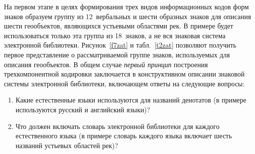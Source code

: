 \begin{multicols}{2}
   На первом этапе в целях формирования трех видов информационных кодов форм знаков 
образуем группу из 12~вербальных и шести образных знаков для описания шести 
геообъектов, явля\-ющих\-ся устьевыми областями рек. В примере будет использоваться только 
эта группа из 18~знаков, а не вся знаковая система электронной библиотеки. 
Рисунок~\ref{f7zat} и табл.~\ref{t2zat} позволяют получить первое представление о 
рассматриваемой группе знаков, используемых для описания геообъектов. В общем случае 
\textit{первый принцип} построения трехкомпонентной кодировки заключается в 
конструктивном описании знаковой системы электронной библиотеки, включающем ответы 
на следующие вопросы:
   \begin{enumerate}[1.]
\item Какие естественные языки используются для названий денотатов (в примере 
используются русский и английский языки)?
\item Что должен включать словарь электронной биб\-лио\-те\-ки для каждого 
естественного языка (в примере словарь каждого языка включает шесть названий 
устьевых областей рек)?
\end{enumerate}
\pagebreak

\end{multicols}

      \begin{figure} %
   \vspace*{1pt}
\begin{center}
\vspace*{1pt}
\mbox{%
\epsfxsize=156.591mm
}
\end{center}
\vspace*{-9pt}
\vspace*{-2pt}
\end{figure}

